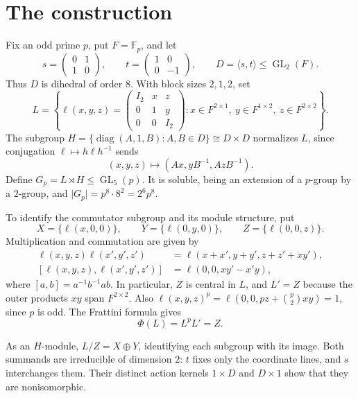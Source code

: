 \documentclass[11pt]{amsart}
\newcommand{\F}{\mathbb F}
\begin{document}
\section{The construction}

Fix an odd prime $p$, put $F=\F_p$, and let
\[
 s=\begin{pmatrix}0&1\\1&0\end{pmatrix},\qquad
 t=\begin{pmatrix}1&0\\0&-1\end{pmatrix},\qquad
 D=\langle s,t\rangle\leq\operatorname{GL}_2(F).
\]
Thus $D$ is dihedral of order $8$. With block sizes $2,1,2$, set
\[
 L=\left\{
 \ell(x,y,z)=\begin{pmatrix}I_2&x&z\\0&1&y\\0&0&I_2\end{pmatrix}
 :x\in F^{2\times1},\ y\in F^{1\times2},\ z\in F^{2\times2}
 \right\}.
\]
The subgroup
$H=\{\operatorname{diag}(A,1,B):A,B\in D\}\cong D\times D$
normalizes $L$, since conjugation $\ell\mapsto h\ell h^{-1}$ sends
\begin{equation}\label{eq:action}
 (x,y,z)\longmapsto(Ax,yB^{-1},AzB^{-1}).
\end{equation}
Define $G_p=L\rtimes H\leq\operatorname{GL}_5(p)$.
It is soluble, being an extension of a $p$-group by a $2$-group, and
$\lvert G_p\rvert=p^8\cdot 8^2=2^6p^8$.

To identify the commutator subgroup and its module structure, put
\[
 X=\{\ell(x,0,0)\},\qquad Y=\{\ell(0,y,0)\},\qquad
 Z=\{\ell(0,0,z)\}.
\]
Multiplication and commutation are given by
\begin{align*}
 \ell(x,y,z)\ell(x',y',z')
   &=\ell(x+x',y+y',z+z'+xy'),\\
 [\ell(x,y,z),\ell(x',y',z')]
   &=\ell(0,0,xy'-x'y),
\end{align*}
where $[a,b]=a^{-1}b^{-1}ab$. In particular, $Z$ is central in $L$, and
$L'=Z$ because the outer products $xy$ span $F^{2\times2}$.
Also $\ell(x,y,z)^p=\ell(0,0,pz+\binom p2xy)=1$, since $p$ is odd.
The Frattini formula gives
\begin{equation}\label{eq:frattini}
 \Phi(L)=L^pL'=Z.
\end{equation}

As an $H$-module, $L/Z=X\oplus Y$, identifying each subgroup with its image.
Both summands are irreducible of dimension $2$: $t$ fixes only the coordinate
lines, and $s$ interchanges them. Their distinct action kernels
$1\times D$ and $D\times1$ show that they are nonisomorphic.
\end{document}
